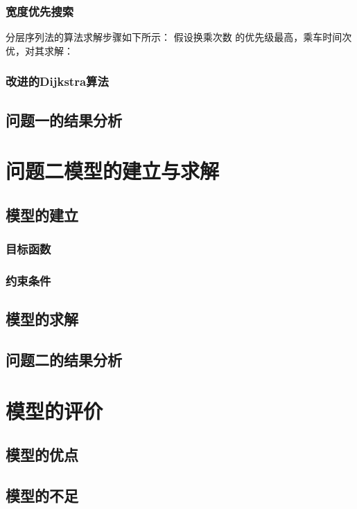 \documentclass[nocover]{cumcmart}%
\begin{document}
\subsubsection{宽度优先搜索}
分层序列法的算法求解步骤如下所示：
假设换乘次数 的优先级最高，乘车时间次优，对其求解：

\subsubsection{改进的Dijkstra算法}

\subsection{问题一的结果分析}

\section{问题二模型的建立与求解}
\subsection{模型的建立}
\subsubsection{目标函数}
\subsubsection{约束条件}
\subsection{模型的求解}
\subsection{问题二的结果分析}

\section{模型的评价}
\subsection{模型的优点}
\subsection{模型的不足}
\end{document}
